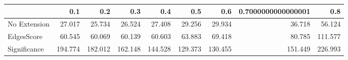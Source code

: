\begin{tabular}{lrrrrrrrr}
\toprule
{} &     0.1 &     0.2 &     0.3 &     0.4 &     0.5 &     0.6 & 0.7000000000000001 &     0.8 \\
\midrule
No Extension &  27.017 &  25.734 &  26.524 &  27.408 &  29.256 &  29.934 &             36.718 &  56.124 \\
EdgesScore   &  60.545 &  60.069 &  60.139 &  60.603 &  63.883 &  69.418 &             80.785 & 111.577 \\
Significance & 194.774 & 182.012 & 162.148 & 144.528 & 129.373 & 130.455 &            151.449 & 226.993 \\
\bottomrule
\end{tabular}

